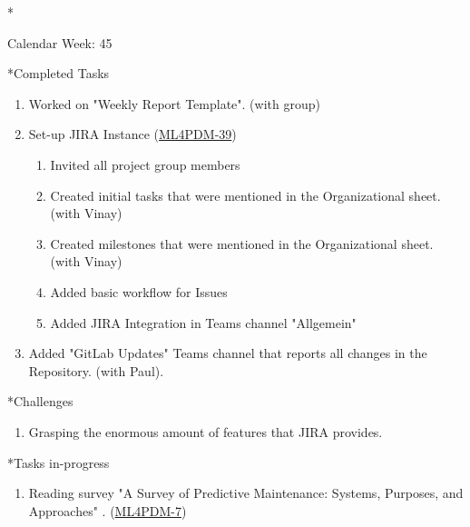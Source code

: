 \documentclass[11pt,a4paper]{article}
\begin{document}
\newpage
\begin{section}*{Calendar Week: 45 \hfill \date{06 November, 2020}}
 \begin{refsection}

   \begin{subsection}*{Completed Tasks}
     \begin{enumerate}
       \item
             Worked on "Weekly Report Template". (with group)
       \item
             Set-up JIRA Instance (\href{https://ml4pdm.atlassian.net/browse/ML4PDM-39}{ML4PDM-39})
             \begin{enumerate}
               \item
                     Invited all project group members
               \item
                     Created initial tasks that were mentioned in the Organizational sheet. (with Vinay)
               \item
                     Created milestones that were mentioned in the Organizational sheet. (with Vinay)
               \item
                     Added basic workflow for Issues
               \item
                     Added JIRA Integration in Teams channel "Allgemein"

             \end{enumerate}
       \item
             Added "GitLab Updates" Teams channel that reports all changes in the Repository. (with Paul).
     \end{enumerate}
   \end{subsection}

   \begin{subsection}*{Challenges}
     \begin{enumerate}
       \item
             Grasping the enormous amount of features that JIRA provides.
     \end{enumerate}
   \end{subsection}

   \begin{subsection}*{Tasks in-progress}
     \begin{enumerate}
       \item
             Reading survey "A Survey of Predictive Maintenance: Systems, Purposes, and Approaches" \cite{DBLP:journals/corr/abs-1912-07383}. (\href{https://ml4pdm.atlassian.net/browse/ML4PDM-7}{ML4PDM-7})
     \end{enumerate}
   \end{subsection}

   \printbibliography
 \end{refsection}
\end{section}
\end{document}
